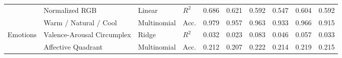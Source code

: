 \begin{table}[htbp]
{\begin{tabular}{ll ll rr rr rr}
 & Normalized RGB & Linear & $R^2$ & 0.686 & 0.621 & 0.592 & 0.547 & 0.604 & 0.592 \\
 & Warm / Natural / Cool & Multinomial & Acc. & 0.979 & 0.957 & 0.963 & 0.933 & 0.966 & 0.915 \\
\midrule
\multirow{2}{*}{Emotions} & Valence-Arousal Circumplex & Ridge & $R^2$ & 0.032 & 0.023 & 0.083 & 0.046 & 0.057 & 0.033 \\
 & Affective Quadrant & Multinomial & Acc. & 0.212 & 0.207 & 0.222 & 0.214 & 0.219 & 0.215 \\
\bottomrule
\end{tabular}
}%
\end{table}